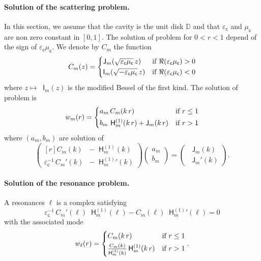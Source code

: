 \documentclass[12pt,a4paper]{article}
\theoremstyle{definition}
\theoremstyle{plain}
\theoremstyle{remark}
\newcommand{\bbD}{\mathbb{D}}
\newcommand{\bJ}{\mathop{}\!\mathsf{J}}
\newcommand{\Hu}{\mathop{}\!\mathsf{H}^{(1)}}
\newcommand{\bI}{\mathop{}\!\mathsf{I}}
\newcommand{\ecav}{\varepsilon_\mathsf{c}}
\newcommand{\mcav}{\mu_\mathsf{c}}
\begin{document}
\paragraph{Solution of the scattering problem.}
In this section, we assume that the cavity is the unit disk $\bbD$ and that $\ecav$ and $\mcav$ are non zero constant in $[0, 1]$.
The solution of problem  for $0 < r < 1$ depend of the sign of $\ecav\mcav$.
We denote by $C_m$ the function
\[
    C_m(z) = \begin{dcases}
        \bJ_m(\sqrt{\ecav\mcav}\, z)  & \text{if } \Re(\ecav\mcav) > 0 \\
        \bI_m(\sqrt{-\ecav\mcav}\, z) & \text{if } \Re(\ecav\mcav) < 0
    \end{dcases}
\]
where $z \mapsto \bI_m(z)$ is the modified Bessel of the first kind.
The solution of problem  is
\begin{equation}
    w_m(r) = \begin{dcases}
        a_m\, C_m(k\, r)                  & \text{if } r \le 1 \\
        b_m\, \Hu_m(k\, r) + \bJ_m(k\, r) & \text{if } r > 1
    \end{dcases}
\end{equation}
where $(a_m, b_m)$ are solution of
\begin{equation}
    \begin{pmatrix*}[r]
        C_m(k) & -\Hu_m(k)\\[1ex]
        \ecav^{-1}\, C_m'(k) & -{\Hu_m}'(k)
    \end{pmatrix*}
    \begin{pmatrix}
        a_m \\[1ex]
        b_m
    \end{pmatrix} =
    \begin{pmatrix}
        \bJ_m(k) \\[1ex]
        \bJ_m'(k)
    \end{pmatrix}.
\end{equation}

\paragraph{Solution of the resonance problem.}
A resonances $\ell$ is a complex satisfying
\begin{equation}
    \ecav^{-1}\, C_m'(\ell) \Hu_m(\ell) - C_m(\ell) {\Hu_m}'(\ell) = 0
\end{equation}
with the associated mode
\begin{equation}
    w_\ell(r) = \begin{dcases}
        C_m(k\, r)                           & \text{if } r \le 1 \\
        \tfrac{C_m(k)}{\Hu_m(k)}\Hu_m(k\, r) & \text{if } r > 1
    \end{dcases}.
\end{equation}
\end{document}
